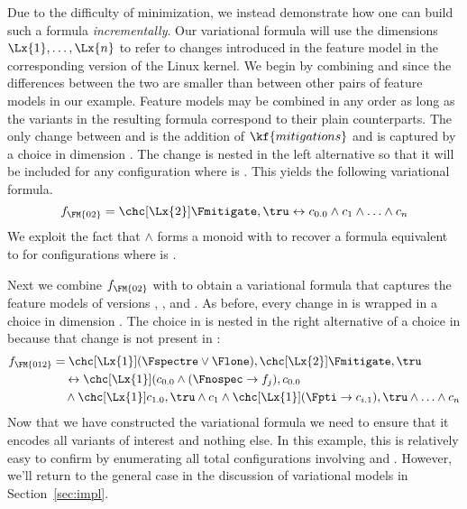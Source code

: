 Due to the difficulty of minimization, we instead demonstrate how one can build
such a formula \emph{incrementally}.
%
Our variational formula will use the dimensions $\Lx{1},\ldots,\Lx{n}$ to refer
to changes introduced in the feature model in the corresponding version of the Linux
kernel.
%
We begin by combining  and  since the differences between the two
are smaller than between other pairs of feature models in our example. Feature
models may be combined in any order as long as the variants in the resulting
formula correspond to their plain counterparts. The only change between 
and  is the addition of $\kf{mitigations}$ and is captured by a choice in
dimension . The change is nested in the left alternative so that it will
be included for any configuration where  is \true. This yields the
following variational formula.
%
\begin{equation*}
  f_{\FM{02}} =
  \chc[\Lx{2}]{\Fmitigate,\tru}
  \leftrightarrow c_{0.0} \wedge c_{1} \wedge \ldots \wedge c_{n}
\end{equation*}
%
%
We exploit the fact that $\wedge$ forms a monoid with \tru{} to recover a
formula equivalent to  for configurations where  is \false.

Next we combine $f_{\text{\FM{02}}}$ with  to obtain a variational formula
that captures the feature models of versions , , and . As
before, every change in  is wrapped in a choice in dimension . The
choice in  is nested in the right alternative of a choice in 
because that change is not present in :
%
\begin{align*}
  f_{\FM{012}}
    &= \chc[\Lx{1}]{(\Fspectre \vee \Flone),
         \chc[\Lx{2}]{\Fmitigate,\tru}} \\
    &\quad \leftrightarrow
      \chc[\Lx{1}]{(c_{0.0} \wedge (\Fnospec \rightarrow f_j), c_{0.0}} \\
    &\quad \wedge
      \chc[\Lx{1}]{c_{1.0},\tru} \wedge c_1 \wedge
        \chc[\Lx{1}]{(\Fpti \rightarrow c_{i.1}), \tru} \wedge \ldots \wedge c_{n}
\end{align*}
%
%
Now that we have constructed the variational formula we need to ensure that it
encodes all variants of interest and nothing else. In this example, this is
relatively easy to confirm by enumerating all total configurations involving
 and . However, we'll return to the general case in the discussion
of variational models in Section~\ref{sec:impl}.

